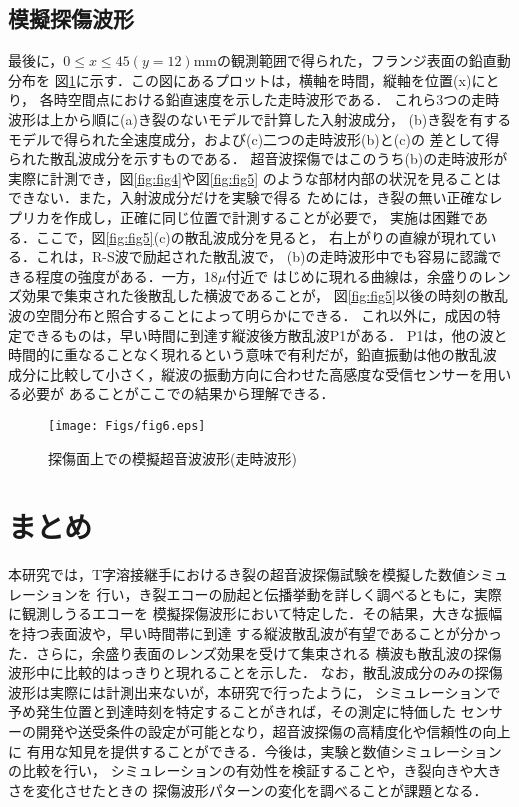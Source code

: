 \documentclass{jsce}
\begin{document}
\subsection{模擬探傷波形}
最後に，$0\leq x\leq 45 (y=12)$mmの観測範囲で得られた，フランジ表面の鉛直動分布を
図\ref{fig:fig6}に示す．この図にあるプロットは，横軸を時間，縦軸を位置(x)にとり，
各時空間点における鉛直速度を示した走時波形である．
これら3つの走時波形は上から順に(a)き裂のないモデルで計算した入射波成分，
(b)き裂を有するモデルで得られた全速度成分，および(c)二つの走時波形(b)と(c)の
差として得られた散乱波成分を示すものである．
超音波探傷ではこのうち(b)の走時波形が実際に計測でき，図\ref{fig:fig4}や図\ref{fig:fig5}
のような部材内部の状況を見ることはできない．また，入射波成分だけを実験で得る
ためには，き裂の無い正確なレプリカを作成し，正確に同じ位置で計測することが必要で，
実施は困難である．ここで，図\ref{fig:fig5}(c)の散乱波成分を見ると，
右上がりの直線が現れている．これは，R-S波で励起された散乱波で，
(b)の走時波形中でも容易に認識できる程度の強度がある．一方，18$\mu$付近で
はじめに現れる曲線は，余盛りのレンズ効果で集束された後散乱した横波であることが，
図\ref{fig:fig5}以後の時刻の散乱波の空間分布と照合することによって明らかにできる．
これ以外に，成因の特定できるものは，早い時間に到達す縦波後方散乱波P1がある．
P1は，他の波と時間的に重なることなく現れるという意味で有利だが，鉛直振動は他の散乱波
成分に比較して小さく，縦波の振動方向に合わせた高感度な受信センサーを用いる必要が
あることがここでの結果から理解できる．
\begin{figure}[h]
	\begin{center}
	\texttt{[image: Figs/fig6.eps]} 
	\end{center}
	\caption{
		探傷面上での模擬超音波波形(走時波形)
	} 
	\label{fig:fig6}
\end{figure}
\section{まとめ}
本研究では，T字溶接継手におけるき裂の超音波探傷試験を模擬した数値シミュレーションを
行い，き裂エコーの励起と伝播挙動を詳しく調べるともに，実際に観測しうるエコーを
模擬探傷波形において特定した．その結果，大きな振幅を持つ表面波や，早い時間帯に到達
する縦波散乱波が有望であることが分かった．さらに，余盛り表面のレンズ効果を受けて集束される
横波も散乱波の探傷波形中に比較的はっきりと現れることを示した．
なお，散乱波成分のみの探傷波形は実際には計測出来ないが，本研究で行ったように，
シミュレーションで予め発生位置と到達時刻を特定することがきれば，その測定に特価した
センサーの開発や送受条件の設定が可能となり，超音波探傷の高精度化や信頼性の向上に
有用な知見を提供することができる．今後は，実験と数値シミュレーションの比較を行い，
シミュレーションの有効性を検証することや，き裂向きや大きさを変化させたときの
探傷波形パターンの変化を調べることが課題となる．
\end{document}
